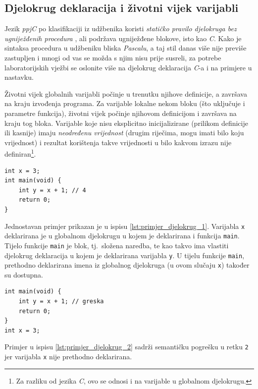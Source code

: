 \documentclass[times, 12pt, utf8]{book}
\begin{document}
\subsection{Djelokrug deklaracija i životni vijek varijabli}
Jezik \emph{ppjC} po klasifikaciji iz udžbenika koristi \emph{statičko pravilo djelokruga bez ugniježđenih procedura} \cite[str.~223--224]{udzbenik}, ali podržava ugniježđene blokove, isto kao \emph{C}.
Kako je sintaksa procedura u udžbeniku bliska \emph{Pascalu}, a taj stil danas više nije previše zastupljen i mnogi od vas se možda s njim nisu prije susreli, za potrebe laboratorijskih vježbi se oslonite više na djelokrug deklaracija \emph{C}-a i na primjere u nastavku.

Životni vijek globalnih varijabli počinje u trenutku njihove definicije, a završava na kraju izvođenja programa.
Za varijable lokalne nekom bloku (što uključuje i parametre funkcija), životni vijek počinje njihovom definicijom i završava na kraju tog bloka.
Varijable koje nisu eksplicitno inicijalizirane (prilikom definicije ili kasnije) imaju \emph{neodređenu vrijednost} (drugim riječima, mogu imati bilo koju vrijednost) i rezultat korištenja takve vrijednosti u bilo kakvom izrazu nije definiran\footnote{Za razliku od jezika \emph{C}, ovo se odnosi i na varijable u globalnom djelokrugu.}.

\begin{lstlisting}[caption={Jednostavan primjer djelokruga deklaracija.},label=lst:primjer_djelokrug_1]
int x = 3;
int main(void) {
    int y = x + 1; // 4
    return 0;
}
\end{lstlisting}

Jednostavan primjer prikazan je u ispisu \ref{lst:primjer_djelokrug_1}.
Varijabla \verb|x| deklarirana je u globalnom djelokrugu u kojem je deklarirana i funkcija \verb|main|.
Tijelo funkcije \verb|main| je blok, tj.~složena naredba, te kao takvo ima vlastiti djelokrug deklaracija u kojem je deklarirana varijabla \verb|y|.
U tijelu funkcije \verb|main|, prethodno deklarirana imena iz globalnog djelokruga (u ovom slučaju \verb|x|) također su dostupna.

\begin{lstlisting}[caption={Primjer pogreške u djelokrugu---varijabla \texttt{x} nije deklarirana prije korištenja.},label=lst:primjer_djelokrug_2]
int main(void) {
    int y = x + 1; // greska
    return 0;
}
int x = 3;
\end{lstlisting}

Primjer u ispisu \ref{lst:primjer_djelokrug_2} sadrži semantičku pogrešku u retku \verb|2| jer varijabla \verb|x| nije prethodno deklarirana.
\end{document}
